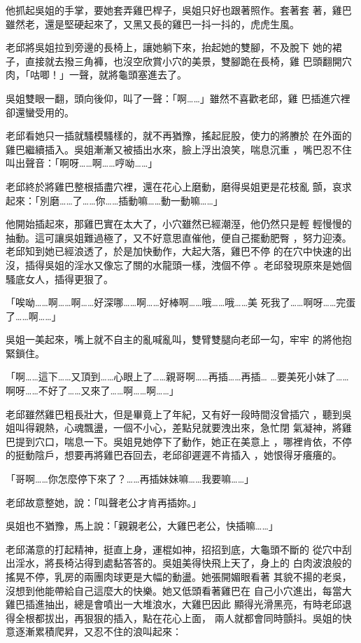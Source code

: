 他抓起吳姐的手掌，要她套弄雞巴桿子，吳姐只好也跟著照作。套著套
著，雞巴雖然老，還是堅硬起來了，又黑又長的雞巴一抖一抖的，虎虎生風。

老邱將吳姐拉到旁邊的長椅上，讓她躺下來，抬起她的雙腳，不及脫下
她的裙子，直接就去撥三角褲，也沒空欣賞小穴的美景，雙腳跪在長椅，雞
巴頭翻開穴肉，「咕唧！」一聲，就將龜頭塞進去了。

吳姐雙眼一翻，頭向後仰，叫了一聲：「啊……」雖然不喜歡老邱，雞
巴插進穴裡卻還蠻受用的。

老邱看她只一插就騷模騷樣的，就不再猶豫，搖起屁股，使力的將賸於
在外面的雞巴繼續插入。吳姐漸漸又被插出水來，臉上浮出浪笑，喘息沉重
，嘴巴忍不住叫出聲音：「啊呀……啊……哼呦……」

老邱終於將雞巴整根插盡穴裡，還在花心上磨動，磨得吳姐更是花枝亂
顫，哀求起來：「別磨……了……你……插動嘛……動一動嘛……」

他開始插起來，那雞巴實在太大了，小穴雖然已經潮溼，他仍然只是輕
輕慢慢的抽動。這可讓吳姐難過極了，又不好意思直催他，便自己擺動肥臀
，努力迎湊。老邱知到她已經浪透了，於是加快動作，大起大落，雞巴不停
的在穴中快速的出沒，插得吳姐的淫水又像忘了關的水龍頭一樣，洩個不停
。老邱發現原來是她個騷底女人，插得更狠了。

「唉呦……啊……啊……好深哪……啊……好棒啊……哦……哦……美
死我了……啊呀……完蛋了……啊……」

吳姐一美起來，嘴上就不自主的亂喊亂叫，雙臂雙腿向老邱一勾，牢牢
的將他抱緊鎖住。

「啊……這下……又頂到……心眼上了……親哥啊……再插……再插…
…要美死小妹了……啊呀……不好了……又來了……啊……啊……」

老邱雖然雞巴粗長壯大，但是畢竟上了年紀，又有好一段時間沒曾插穴
，聽到吳姐叫得親熱，心魂飄盪，一個不小心，差點兒就要洩出來，急忙閉
氣凝神，將雞巴提到穴口，喘息一下。吳姐見她停下了動作，她正在美意上
，哪裡肯依，不停的挺動陰戶，想要再將雞巴吞回去，老邱卻遲遲不肯插入
，她恨得牙癢癢的。

「哥啊……你怎麼停下來了？……再插妹妹嘛……我要嘛……」

老邱故意整她，說：「叫聲老公才肯再插妳。」

吳姐也不猶豫，馬上說：「親親老公，大雞巴老公，快插嘛……」

老邱滿意的打起精神，挺直上身，運棍如神，招招到底，大龜頭不斷的
從穴中刮出淫水，將長椅沾得到處黏答答的。吳姐美得快飛上天了，身上的
白肉波浪般的搖晃不停，乳房的兩團肉球更是大幅的動盪。她張開媚眼看著
其貌不揚的老吳，沒想到他能帶給自己這麼大的快樂。她又低頭看著雞巴在
自己小穴進出，每當大雞巴插進抽出，總是會噴出一大堆浪水，大雞巴因此
顯得光滑黑亮，有時老邱退得全根都拔出，再狠狠的插入，點在花心上面，
兩人就都會同時顫抖。吳姐的快意逐漸累積爬昇，又忍不住的浪叫起來：

